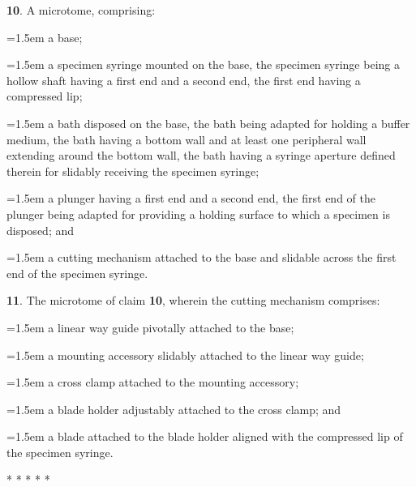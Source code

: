\documentclass{article}
\begin{document}
\begin{hangpars}
\textbf{10}. A microtome, comprising:

{\leftskip=1.5em\parindent=0pt a base;\par}
{\leftskip=1.5em\parindent=0pt a specimen syringe mounted on the base, the specimen syringe being a hollow shaft having a first end and a second end, the first end having a compressed lip;\par}
{\leftskip=1.5em\parindent=0pt a bath disposed on the base, the bath being adapted for holding a buffer medium, the bath having a bottom wall and at least one peripheral wall extending around the bottom wall, the bath having a syringe aperture defined therein for slidably receiving the specimen syringe;\par}
{\leftskip=1.5em\parindent=0pt a plunger having a first end and a second end, the first end of the plunger being adapted for providing a holding surface to which a specimen is disposed; and\par}
{\leftskip=1.5em\parindent=0pt a cutting mechanism attached to the base and slidable across the first end of the specimen syringe.\par}

\textbf{11}. The microtome of claim \textbf{10}, wherein the cutting mechanism comprises:

{\leftskip=1.5em\parindent=0pt a linear way guide pivotally attached to the base;\par}
{\leftskip=1.5em\parindent=0pt a mounting accessory slidably attached to the linear way guide;\par}
{\leftskip=1.5em\parindent=0pt a cross clamp attached to the mounting accessory;\par}
{\leftskip=1.5em\parindent=0pt a blade holder adjustably attached to the cross clamp; and\par}
{\leftskip=1.5em\parindent=0pt a blade attached to the blade holder aligned with the compressed lip of the specimen syringe.\par}

\end{hangpars}

\begin{center}
* * * * *
\end{center}
\end{document}
